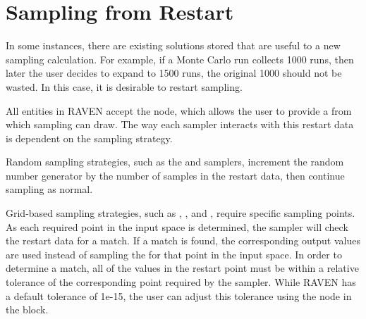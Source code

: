 \section{Sampling from Restart}
\label{sec:samplingFromRestart}
In some instances, there are existing solutions stored that are useful to a new sampling calculation.  For
example, if a Monte Carlo run collects 1000 runs, then later the user decides to expand to 1500 runs, the
original 1000 should not be wasted.  In this case, it is desirable to restart sampling.

All  entities in RAVEN accept the  node, which allows the user to provide a
 from which sampling can draw.  The way each sampler interacts with this restart data is
dependent on the sampling strategy.

Random sampling strategies, such as the  and  samplers, increment the
random number generator by the number of samples in the restart data, then continue sampling as normal.

Grid-based sampling strategies, such as , , and ,
require specific sampling points.  As each required point in the input space is determined, the sampler will
check the restart data for a match.  If a match is found, the corresponding output values are used instead of
sampling the  for that point in the input space.  In order to determine a match, all of the
values in the restart point must be within a relative tolerance of the corresponding point required by the
sampler.  While RAVEN has a default tolerance of 1e-15, the user can adjust this tolerance using the
 node in the  block.

